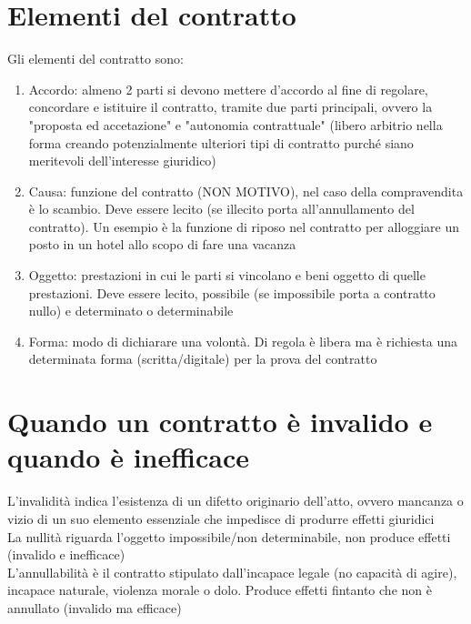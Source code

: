 \documentclass[8pt,oneside,a4paper]{article}
\begin{document}
	\section{Elementi del contratto}
	Gli elementi del contratto sono:
	\begin{enumerate}
		\item Accordo: almeno 2 parti si devono mettere d'accordo al fine di regolare, concordare e istituire il contratto, tramite due parti principali, ovvero la "proposta ed accetazione" e "autonomia contrattuale" (libero arbitrio nella forma creando potenzialmente ulteriori tipi di contratto purché siano meritevoli dell'interesse giuridico)
		\item Causa: funzione del contratto (NON MOTIVO), nel caso della compravendita è lo scambio. Deve essere lecito (se illecito porta all'annullamento del contratto). Un esempio è la funzione di riposo nel contratto per alloggiare un posto in un hotel allo scopo di fare una vacanza
		\item Oggetto: prestazioni in cui le parti si vincolano e beni oggetto di quelle prestazioni. Deve essere lecito, possibile (se impossibile porta a contratto nullo) e determinato o determinabile
		\item Forma: modo di dichiarare una volontà. Di regola è libera ma è richiesta una determinata forma (scritta/digitale) per la prova del contratto
	\end{enumerate}
	\section{Quando un contratto è invalido e quando è inefficace}
	L'invalidità indica l'esistenza di un difetto originario dell'atto, ovvero mancanza o vizio di un suo elemento essenziale che impedisce di produrre effetti giuridici\\
	La nullità riguarda l'oggetto impossibile/non determinabile, non produce effetti (invalido e inefficace)\\
	L'annullabilità è il contratto stipulato dall'incapace legale (no capacità di agire), incapace naturale, violenza morale o dolo. Produce effetti fintanto che non è annullato (invalido ma efficace)
\end{document}
